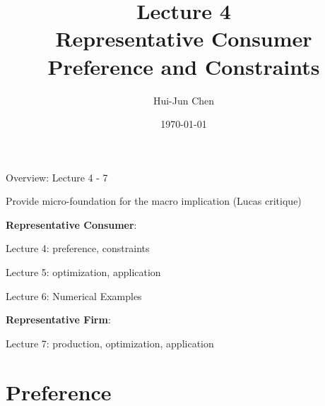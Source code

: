 \documentclass[11pt,aspectratio=169,usenames,dvipsnames]{beamer}
\title[Lecture 4]{Lecture 4 \\ Representative Consumer \\ Preference and Constraints }
\author[Hui-Jun Chen]{Hui-Jun Chen}
\institute[NTHU]{National Tsing Hua University}
\date{\today}
\let\tempone\itemize
\let\temptwo\enditemize
\renewenvironment{itemize}{\tempone\addtolength{\itemsep}{\fill}}{\temptwo}
\begin{document}
\begin{frame}[plain]
    \titlepage
\end{frame}

\begin{frame}{Overview: Lecture 4 - 7}
\label{slide:Overview__Lecture_4_7}

\begin{center}
Provide \alert{micro-foundation} for the \alert{macro implication} (\alert{Lucas critique})
\end{center}

\begin{itemize}
    \item \textbf{Representative Consumer}:
    \begin{itemize}
        \item Lecture 4: \alert{preference}, \alert{constraints}
        \item Lecture 5: \alert{optimization}, \alert{application}
        \item Lecture 6: Numerical Examples
    \end{itemize}
    \item \textbf{Representative Firm}:
    \begin{itemize}
        \item Lecture 7: \alert{production}, \alert{optimization}, \alert{application}
    \end{itemize}
\end{itemize}
\end{frame}

\section{Preference}
\label{sec:Preference}
\end{document}
